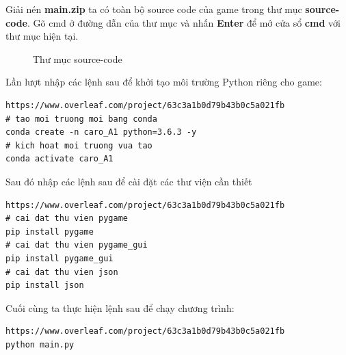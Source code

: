Giải nén \textbf{main.zip} ta có toàn bộ source code của game trong thư mục \textbf{source-code}. Gõ cmd ở đường dẫn của thư mục và nhấn \textbf{Enter} để mở cửa sổ \textbf{cmd} với thư mục hiện tại.
\begin{figure}[H]
\caption{Thư mục source-code}
\end{figure}
Lần lượt nhập các lệnh sau để khởi tạo môi trường Python riêng cho game:
\begin{lstlisting}https://www.overleaf.com/project/63c3a1b0d79b43b0c5a021fb
# tao moi truong moi bang conda
conda create -n caro_A1 python=3.6.3 -y
# kich hoat moi truong vua tao
conda activate caro_A1
\end{lstlisting}

Sau đó nhập các lệnh sau để cài đặt các thư viện cần thiết
\begin{lstlisting}https://www.overleaf.com/project/63c3a1b0d79b43b0c5a021fb
# cai dat thu vien pygame
pip install pygame
# cai dat thu vien pygame_gui
pip install pygame_gui
# cai dat thu vien json
pip install json
\end{lstlisting}

Cuối cùng ta thực hiện lệnh sau để chạy chương trình:
\begin{lstlisting}https://www.overleaf.com/project/63c3a1b0d79b43b0c5a021fb
python main.py
\end{lstlisting}